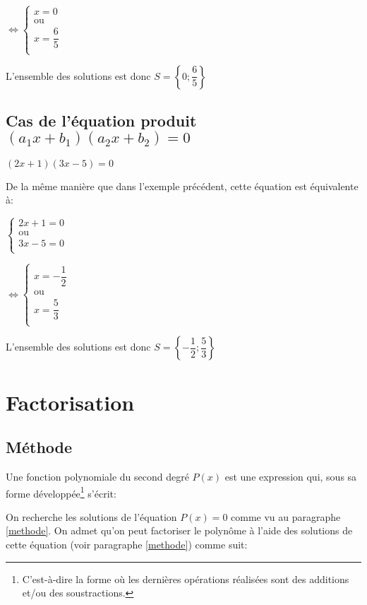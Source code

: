 \documentclass[a4paper,12pt]{scrartcl}
\begin{document}
$
\Leftrightarrow
\left\lbrace
\begin{array}{ll}
   x = 0 \\
   \mbox{ou} \\
   x = \dfrac{6}{5} \\
\end{array}
\right.
$ 

L'ensemble des solutions est donc $S = \left\lbrace 0 ; \dfrac{6}{5} \right\rbrace$

\subsection{Cas de l'équation produit $(a_1 x + b_1)(a_2 x + b_2) = 0$}

\exemple{}
$(2x +1)(3x -5) = 0$ 

De la même manière que dans l'exemple précédent, cette équation est équivalente à:

$\left\lbrace
\begin{array}{ll}
   2x +1 = 0 \\
   \mbox{ou} \\
   3x -5 = 0 \\
\end{array}
\right.
$ 

$
\Leftrightarrow
\left\lbrace
\begin{array}{ll}
   x = -\dfrac{1}{2} \\
   \mbox{ou} \\
   x = \dfrac{5}{3} \\
\end{array}
\right.
$ 

L'ensemble des solutions est donc $S = \left\lbrace -\dfrac{1}{2} ; \dfrac{5}{3} \right\rbrace$

\section{Factorisation}

\subsection{Méthode}

Une fonction polynomiale du second degré $P(x)$ est une expression qui, sous sa forme développée\footnote{C'est-à-dire la forme où les dernières opérations réalisées sont des additions et/ou des soustractions.} s'écrit:


On recherche les solutions de l'équation $P(x) = 0$ comme vu au paragraphe \vref{methode}. On admet qu'on peut factoriser le polynôme à l'aide des solutions de cette équation (voir paragraphe \vref{methode}) comme suit: 
\end{document}
